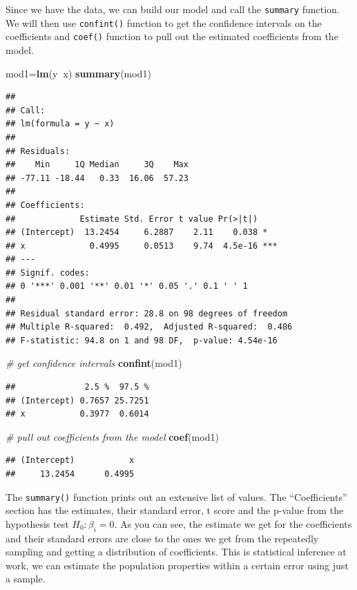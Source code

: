 \documentclass[12pt,]{krantz}
\newenvironment{Shaded}{\begin{snugshade}}{\end{snugshade}}
\newcommand{\CommentTok}[1]{\textcolor[rgb]{0.56,0.35,0.01}{\textit{#1}}}
\newcommand{\KeywordTok}[1]{\textcolor[rgb]{0.13,0.29,0.53}{\textbf{#1}}}
\newcommand{\NormalTok}[1]{#1}
\newcommand{\OperatorTok}[1]{\textcolor[rgb]{0.81,0.36,0.00}{\textbf{#1}}}
\theoremstyle{definition}
\theoremstyle{definition}
\theoremstyle{definition}
\theoremstyle{remark}
\begin{document}
Since we have the data, we can build our model and call the
\texttt{summary} function. We will then use \texttt{confint()} function
to get the confidence intervals on the coefficients and \texttt{coef()}
function to pull out the estimated coefficients from the model.

\begin{Shaded}
\begin{Highlighting}[]
\NormalTok{mod1=}\KeywordTok{lm}\NormalTok{(y}\OperatorTok{~}\NormalTok{x)}
\KeywordTok{summary}\NormalTok{(mod1)}
\end{Highlighting}
\end{Shaded}

\begin{verbatim}
## 
## Call:
## lm(formula = y ~ x)
## 
## Residuals:
##    Min     1Q Median     3Q    Max 
## -77.11 -18.44   0.33  16.06  57.23 
## 
## Coefficients:
##             Estimate Std. Error t value Pr(>|t|)    
## (Intercept)  13.2454     6.2887    2.11    0.038 *  
## x             0.4995     0.0513    9.74  4.5e-16 ***
## ---
## Signif. codes:  
## 0 '***' 0.001 '**' 0.01 '*' 0.05 '.' 0.1 ' ' 1
## 
## Residual standard error: 28.8 on 98 degrees of freedom
## Multiple R-squared:  0.492,  Adjusted R-squared:  0.486 
## F-statistic: 94.8 on 1 and 98 DF,  p-value: 4.54e-16
\end{verbatim}

\begin{Shaded}
\begin{Highlighting}[]
\CommentTok{# get confidence intervals }
\KeywordTok{confint}\NormalTok{(mod1)}
\end{Highlighting}
\end{Shaded}

\begin{verbatim}
##              2.5 %  97.5 %
## (Intercept) 0.7657 25.7251
## x           0.3977  0.6014
\end{verbatim}

\begin{Shaded}
\begin{Highlighting}[]
\CommentTok{# pull out coefficients from the model}
\KeywordTok{coef}\NormalTok{(mod1)}
\end{Highlighting}
\end{Shaded}

\begin{verbatim}
## (Intercept)           x 
##     13.2454      0.4995
\end{verbatim}

The \texttt{summary()} function prints out an extensive list of values.
The ``Coefficients'' section has the estimates, their standard error, t
score and the p-value from the hypothesis test \(H_0:\beta_i=0\). As you
can see, the estimate we get for the coefficients and their standard
errors are close to the ones we get from the repeatedly sampling and
getting a distribution of coefficients. This is statistical inference at
work, we can estimate the population properties within a certain error
using just a sample.
\end{document}
